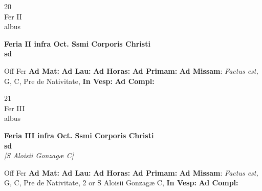 \documentclass[10pt, openany]{book}
\begin{document}
        \begin{center}
            \begin{minipage}{3.5in}
                \vspace{2em}
                \begin{minipage}{0.5in}
                    {\Huge 20} \\
                    {\normalsize Fer II} \\
                    {\normalsize albus}
                \end{minipage}
                \begin{minipage}{3.0in}
                    \textbf{ \large Feria II infra Oct. Ssmi Corporis Christi \\
                    \textnormal{\normalsize sd}} \\ 
                \end{minipage}
                \begin{justify}Off Fer
                    \textbf{Ad Mat: }
                    \textbf{Ad Lau: }
                    \textbf{Ad Horas: }
                    \textbf{Ad Primam: }\textbf{Ad Missam}: \textit{Factus est,} G, C, Pre de Nativitate,  
                    \textbf{In Vesp: }
                    \textbf{Ad Compl: }
                \end{justify}
            \end{minipage}
        \end{center}
    
        \begin{center}
            \begin{minipage}{3.5in}
                \vspace{2em}
                \begin{minipage}{0.5in}
                    {\Huge 21} \\
                    {\normalsize Fer III} \\
                    {\normalsize albus}
                \end{minipage}
                \begin{minipage}{3.0in}
                    \textbf{ \large Feria III infra Oct. Ssmi Corporis Christi \\
                    \textnormal{\normalsize sd}} \\ \textit{[S Aloisii Gonzagæ C]} \\ 
                \end{minipage}
                \begin{justify}Off Fer
                    \textbf{Ad Mat: }
                    \textbf{Ad Lau: }
                    \textbf{Ad Horas: }
                    \textbf{Ad Primam: }\textbf{Ad Missam}: \textit{Factus est,} G, C, Pre de Nativitate, 2 or S Aloisii Gonzagæ C,  
                    \textbf{In Vesp: }
                    \textbf{Ad Compl: }
                \end{justify}
            \end{minipage}
        \end{center}
    
\end{document}
